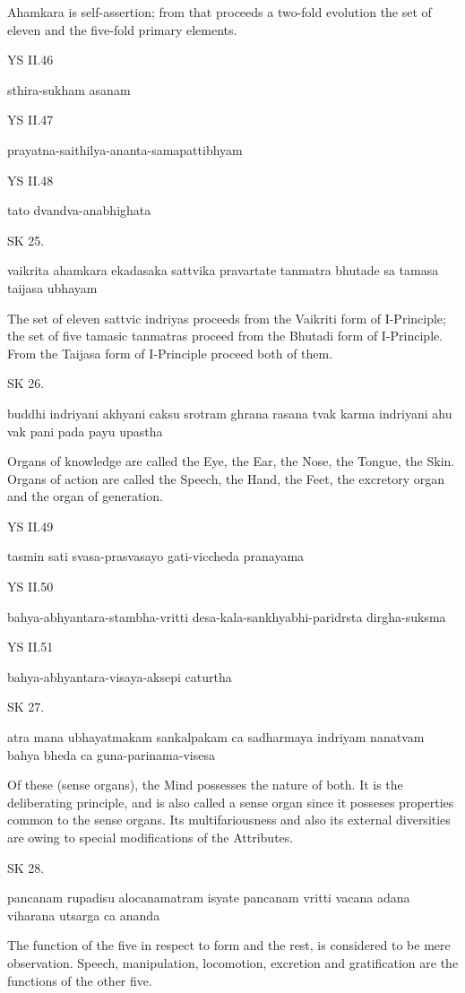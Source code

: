 Ahamkara is self-assertion;
from that proceeds a two-fold evolution
the set of eleven and the five-fold primary elements.

YS II.46

    sthira-sukham asanam

YS II.47

    prayatna-saithilya-ananta-samapattibhyam

YS II.48

    tato dvandva-anabhighata

SK 25.

vaikrita ahamkara ekadasaka sattvika pravartate
tanmatra bhutade sa tamasa taijasa ubhayam

The set of eleven sattvic indriyas proceeds from the Vaikriti form of I-Principle;
the set of five tamasic tanmatras proceed from the Bhutadi form of I-Principle.
From the Taijasa form of I-Principle proceed both of them.

SK 26.

buddhi indriyani akhyani caksu srotram ghrana rasana tvak
karma indriyani ahu vak pani pada payu upastha

Organs of knowledge are called the Eye, the Ear, the Nose, the Tongue, the Skin.
Organs of action are called the Speech, the Hand, the Feet, the excretory organ and the organ of generation.

YS II.49

    tasmin sati svasa-prasvasayo gati-viccheda pranayama

YS II.50

    bahya-abhyantara-stambha-vritti desa-kala-sankhyabhi-paridrsta dirgha-suksma

YS II.51

    bahya-abhyantara-visaya-aksepi caturtha

SK 27.

atra mana ubhayatmakam sankalpakam ca sadharmaya indriyam
nanatvam bahya bheda ca guna-parinama-visesa

Of these (sense organs), the Mind possesses the nature of both.
It is the deliberating principle, and is also called a sense organ
since it posseses properties common to the sense organs.
Its multifariousness and also its external diversities are owing
to special modifications of the Attributes.

SK 28.

pancanam rupadisu alocanamatram isyate
pancanam vritti vacana adana viharana utsarga ca ananda

The function of the five in respect to form and the rest,
is considered to be mere observation.
Speech, manipulation, locomotion, excretion and gratification
are the functions of the other five.

